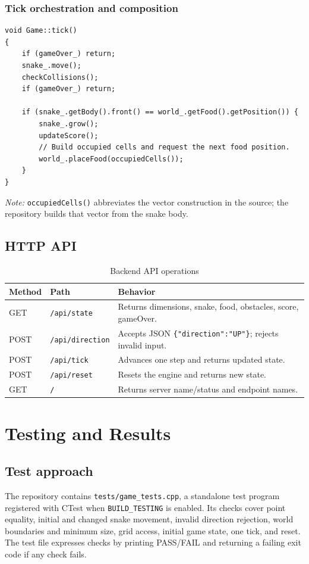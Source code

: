 \documentclass[12pt,a4paper]{report}
\begin{document}
\subsection{Tick orchestration and composition}
\begin{lstlisting}[caption={Game coordinates movement, collisions, and food handling},label={lst:tick}]
void Game::tick()
{
    if (gameOver_) return;
    snake_.move();
    checkCollisions();
    if (gameOver_) return;

    if (snake_.getBody().front() == world_.getFood().getPosition()) {
        snake_.grow();
        updateScore();
        // Build occupied cells and request the next food position.
        world_.placeFood(occupiedCells());
    }
}
\end{lstlisting}
\textit{Note:} \texttt{occupiedCells()} abbreviates the vector construction in
the source; the repository builds that vector from the snake body.

\section{HTTP API}
\begin{table}[H]
\centering
\caption{Backend API operations}
\begin{tabular}{p{27mm}p{34mm}p{72mm}}
\toprule
Method & Path & Behavior\\\midrule
GET & \texttt{/api/state} & Returns dimensions, snake, food, obstacles, score, gameOver.\\
POST & \texttt{/api/direction} & Accepts JSON \texttt{\{"direction":"UP"\}}; rejects invalid input.\\
POST & \texttt{/api/tick} & Advances one step and returns updated state.\\
POST & \texttt{/api/reset} & Resets the engine and returns new state.\\
GET & \texttt{/} & Returns server name/status and endpoint names.\\
\bottomrule
\end{tabular}
\end{table}

\chapter{Testing and Results}
\section{Test approach}
The repository contains \texttt{tests/game\_tests.cpp}, a standalone test
program registered with CTest when \texttt{BUILD\_TESTING} is enabled. Its
checks cover point equality, initial and changed snake movement, invalid
direction rejection, world boundaries and minimum size, grid access, initial
game state, one tick, and reset. The test file expresses checks by printing
PASS/FAIL and returning a failing exit code if any check fails.
\end{document}
